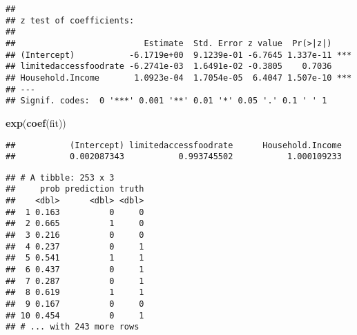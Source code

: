 \documentclass[]{article}
\newenvironment{Shaded}{\begin{snugshade}}{\end{snugshade}}
\newcommand{\CommentTok}[1]{\textcolor[rgb]{0.56,0.35,0.01}{\textit{#1}}}
\newcommand{\DataTypeTok}[1]{\textcolor[rgb]{0.13,0.29,0.53}{#1}}
\newcommand{\DecValTok}[1]{\textcolor[rgb]{0.00,0.00,0.81}{#1}}
\newcommand{\FloatTok}[1]{\textcolor[rgb]{0.00,0.00,0.81}{#1}}
\newcommand{\KeywordTok}[1]{\textcolor[rgb]{0.13,0.29,0.53}{\textbf{#1}}}
\newcommand{\NormalTok}[1]{#1}
\newcommand{\OperatorTok}[1]{\textcolor[rgb]{0.81,0.36,0.00}{\textbf{#1}}}
\newcommand{\StringTok}[1]{\textcolor[rgb]{0.31,0.60,0.02}{#1}}
\begin{document}
\begin{verbatim}
## 
## z test of coefficients:
## 
##                          Estimate  Std. Error z value  Pr(>|z|)    
## (Intercept)           -6.1719e+00  9.1239e-01 -6.7645 1.337e-11 ***
## limitedaccessfoodrate -6.2741e-03  1.6491e-02 -0.3805    0.7036    
## Household.Income       1.0923e-04  1.7054e-05  6.4047 1.507e-10 ***
## ---
## Signif. codes:  0 '***' 0.001 '**' 0.01 '*' 0.05 '.' 0.1 ' ' 1
\end{verbatim}

\begin{Shaded}
\begin{Highlighting}[]
\KeywordTok{exp}\NormalTok{(}\KeywordTok{coef}\NormalTok{(fit))}
\end{Highlighting}
\end{Shaded}

\begin{verbatim}
##           (Intercept) limitedaccessfoodrate      Household.Income 
##           0.002087343           0.993745502           1.000109233
\end{verbatim}

\begin{Shaded}
\end{Shaded}

\begin{verbatim}
## # A tibble: 253 x 3
##     prob prediction truth
##    <dbl>      <dbl> <dbl>
##  1 0.163          0     0
##  2 0.665          1     0
##  3 0.216          0     0
##  4 0.237          0     1
##  5 0.541          1     1
##  6 0.437          0     1
##  7 0.287          0     1
##  8 0.619          1     1
##  9 0.167          0     0
## 10 0.454          0     1
## # ... with 243 more rows
\end{verbatim}
\end{document}
